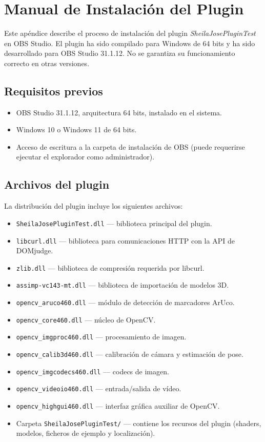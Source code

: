 \chapter{Manual de Instalación del Plugin}
\label{Appendix:Instalacion}

Este apéndice describe el proceso de instalación del plugin \textit{SheilaJosePluginTest} en OBS Studio. El plugin ha sido compilado para Windows de 64 bits y ha sido desarrollado para OBS Studio 31.1.12. No se garantiza su funcionamiento correcto en otras versiones.

\section*{Requisitos previos}

\begin{itemize}
  \item OBS Studio 31.1.12, arquitectura 64 bits, instalado en el sistema.
  \item Windows 10 o Windows 11 de 64 bits.
  \item Acceso de escritura a la carpeta de instalación de OBS (puede requerirse ejecutar el explorador como administrador).
\end{itemize}

\section*{Archivos del plugin}

La distribución del plugin incluye los siguientes archivos:

\begin{itemize}
  \item \texttt{SheilaJosePluginTest.dll} — biblioteca principal del plugin.
  \item \texttt{libcurl.dll} — biblioteca para comunicaciones HTTP con la API de DOMjudge.
  \item \texttt{zlib.dll} — biblioteca de compresión requerida por libcurl.
  \item \texttt{assimp-vc143-mt.dll} — biblioteca de importación de modelos 3D.
  \item \texttt{opencv\_aruco460.dll} — módulo de detección de marcadores ArUco.
  \item \texttt{opencv\_core460.dll} — núcleo de OpenCV.
  \item \texttt{opencv\_imgproc460.dll} — procesamiento de imagen.
  \item \texttt{opencv\_calib3d460.dll} — calibración de cámara y estimación de pose.
  \item \texttt{opencv\_imgcodecs460.dll} — codecs de imagen.
  \item \texttt{opencv\_videoio460.dll} — entrada/salida de vídeo.
  \item \texttt{opencv\_highgui460.dll} — interfaz gráfica auxiliar de OpenCV.
  \item Carpeta \texttt{SheilaJosePluginTest/} — contiene los recursos del plugin (shaders, modelos, ficheros de ejemplo y localización).
\end{itemize}

